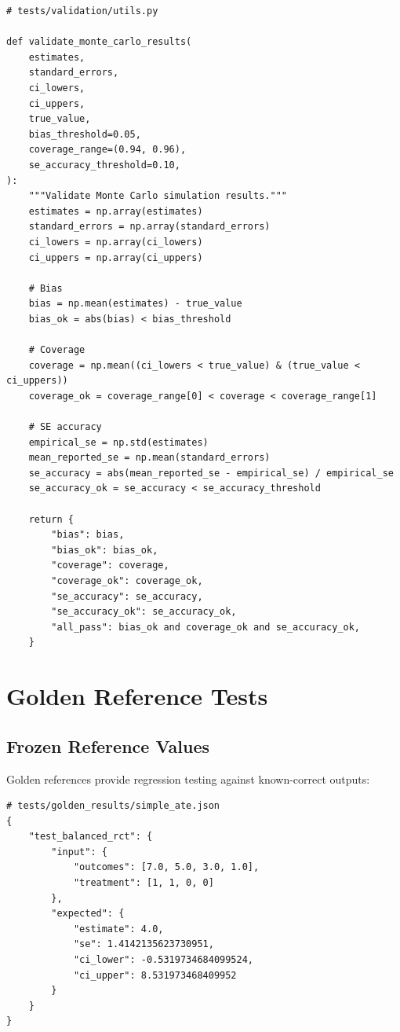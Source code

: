 \begin{verbatim}
# tests/validation/utils.py

def validate_monte_carlo_results(
    estimates,
    standard_errors,
    ci_lowers,
    ci_uppers,
    true_value,
    bias_threshold=0.05,
    coverage_range=(0.94, 0.96),
    se_accuracy_threshold=0.10,
):
    """Validate Monte Carlo simulation results."""
    estimates = np.array(estimates)
    standard_errors = np.array(standard_errors)
    ci_lowers = np.array(ci_lowers)
    ci_uppers = np.array(ci_uppers)

    # Bias
    bias = np.mean(estimates) - true_value
    bias_ok = abs(bias) < bias_threshold

    # Coverage
    coverage = np.mean((ci_lowers < true_value) & (true_value < ci_uppers))
    coverage_ok = coverage_range[0] < coverage < coverage_range[1]

    # SE accuracy
    empirical_se = np.std(estimates)
    mean_reported_se = np.mean(standard_errors)
    se_accuracy = abs(mean_reported_se - empirical_se) / empirical_se
    se_accuracy_ok = se_accuracy < se_accuracy_threshold

    return {
        "bias": bias,
        "bias_ok": bias_ok,
        "coverage": coverage,
        "coverage_ok": coverage_ok,
        "se_accuracy": se_accuracy,
        "se_accuracy_ok": se_accuracy_ok,
        "all_pass": bias_ok and coverage_ok and se_accuracy_ok,
    }
\end{verbatim}


\section{Golden Reference Tests}

\subsection{Frozen Reference Values}

Golden references provide regression testing against known-correct outputs:

\begin{verbatim}
# tests/golden_results/simple_ate.json
{
    "test_balanced_rct": {
        "input": {
            "outcomes": [7.0, 5.0, 3.0, 1.0],
            "treatment": [1, 1, 0, 0]
        },
        "expected": {
            "estimate": 4.0,
            "se": 1.4142135623730951,
            "ci_lower": -0.5319734684099524,
            "ci_upper": 8.531973468409952
        }
    }
}
\end{verbatim}

